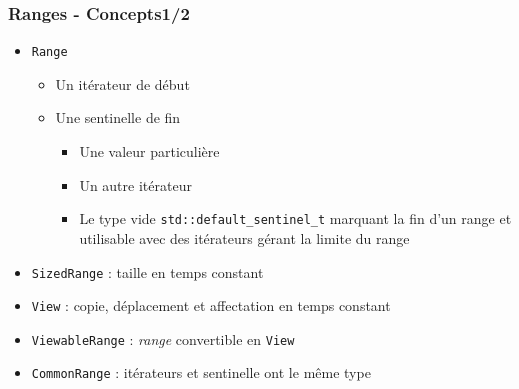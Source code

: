 \documentclass[C++.tex]{subfiles}
\begin{document}
\begin{frame}[fragile]
	\frametitle{Ranges - Concepts\titlehfill{}1/2}
	\begin{itemize}
		\item \lstinline|Range|
		\begin{itemize}
			\item Un itérateur de début
			\item Une sentinelle de fin
			\begin{itemize}
				\item Une valeur particulière
				\item Un autre itérateur


				\item Le type vide \lstinline|std::default_sentinel_t| marquant la fin d'un range et utilisable avec des itérateurs gérant la limite du range

			\end{itemize}
		\end{itemize}

		\item \lstinline|SizedRange| : taille en temps constant
		\item \lstinline|View| : copie, déplacement et affectation en temps constant
		\item \lstinline|ViewableRange| : \textit{range} convertible en \lstinline|View|
		\item \lstinline|CommonRange| : itérateurs et sentinelle ont le même type
	\end{itemize}
\end{frame}
\end{document}
